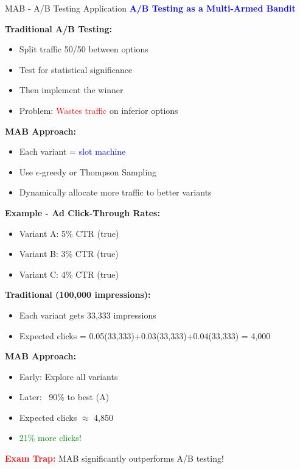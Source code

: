 \documentclass[8pt]{beamer}
\begin{document}
	\begin{frame}{MAB - A/B Testing Application}
		\fontsize{6.5}{7.5}\selectfont
		\textcolor{blue}{\textbf{A/B Testing as a Multi-Armed Bandit}}
		
		\textbf{Traditional A/B Testing:}
		\begin{itemize}
			\item Split traffic 50/50 between options
			\item Test for statistical significance
			\item Then implement the winner
			\item Problem: \textcolor{red}{Wastes traffic} on inferior options
		\end{itemize}
		
		\textbf{MAB Approach:}
		\begin{itemize}
			\item Each variant = \textcolor{blue}{slot machine}
			\item Use $\epsilon$-greedy or Thompson Sampling
			\item Dynamically allocate more traffic to better variants
		\end{itemize}
		
		\textbf{Example - Ad Click-Through Rates:}
		\begin{itemize}
			\item Variant A: 5\% CTR (true)
			\item Variant B: 3\% CTR (true)
			\item Variant C: 4\% CTR (true)
		\end{itemize}
		
		\textbf{Traditional (100,000 impressions):}
		\begin{itemize}
			\item Each variant gets 33,333 impressions
			\item Expected clicks = 0.05(33,333)+0.03(33,333)+0.04(33,333) = 4,000
		\end{itemize}
		
		\textbf{MAB Approach:}
		\begin{itemize}
			\item Early: Explore all variants
			\item Later: ~90\% to best (A)
			\item Expected clicks $\approx$ 4,850
			\item \textcolor{green}{21\% more clicks!}
		\end{itemize}
		
		\textcolor{red}{\textbf{Exam Trap:}} MAB significantly outperforms A/B testing!
	\end{frame}
	
\end{document}

